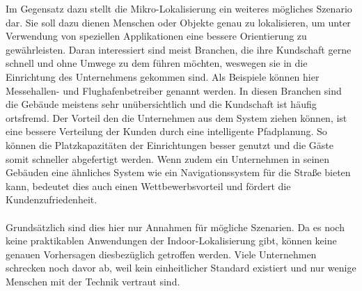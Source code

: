Im Gegensatz dazu stellt die Mikro-Lokalisierung ein weiteres mögliches Szenario dar. Sie soll dazu dienen Menschen oder Objekte genau zu lokalisieren, um unter Verwendung von speziellen Applikationen eine bessere Orientierung zu gewährleisten. Daran interessiert sind meist Branchen, die ihre Kundschaft gerne schnell und ohne Umwege zu dem führen möchten, weswegen sie in die Einrichtung des Unternehmens gekommen sind. Als Beispiele können hier Messehallen- und Flughafenbetreiber genannt werden. In diesen Branchen sind die Gebäude meistens sehr unübersichtlich und die Kundschaft ist häufig ortsfremd. Der Vorteil den die Unternehmen aus dem System ziehen können, ist eine bessere Verteilung der Kunden durch eine intelligente Pfadplanung. So können die Platzkapazitäten der Einrichtungen besser genutzt und die Gäste somit schneller abgefertigt werden. Wenn zudem ein Unternehmen in seinen Gebäuden eine ähnliches System wie ein Navigationssystem für die Straße bieten kann, bedeutet dies auch einen Wettbewerbsvorteil und fördert die Kundenzufriedenheit. \\ \\
Grundsätzlich sind dies hier nur Annahmen für mögliche Szenarien. Da es noch keine praktikablen Anwendungen der Indoor-Lokalisierung gibt, können keine genauen Vorhersagen diesbezüglich getroffen werden. Viele Unternehmen schrecken noch davor ab, weil kein einheitlicher Standard existiert und nur wenige Menschen mit der Technik vertraut sind. \par\bigskip 
